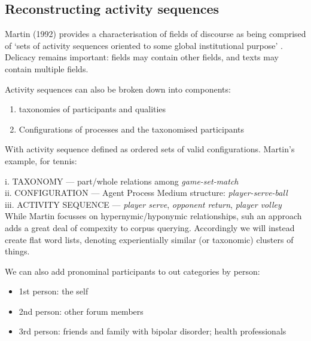 
\subsection{Reconstructing activity sequences}

    Martin (1992) provides a characterisation of fields of discourse as being comprised of `sets of activity sequences oriented to some global institutional purpose' \cite[p.~292]{martin_english_1992}. Delicacy remains important: fields may contain other fields, and texts may contain multiple fields.

    Activity sequences can also be broken down into components:

    \begin{enumerate}
    \item taxonomies of participants and qualities
    \item Configurations of processes and the taxonomised participants
    \end{enumerate}
    With activity sequence defined as ordered sets of valid configurations. Martin's example, for tennis:

    i. TAXONOMY --- part/whole relations among \emph{game-set-match} \\
    ii. CONFIGURATION --- Agent Process Medium structure: \emph{player-serve-ball} \\
    iii. ACTIVITY SEQUENCE --- \emph{player serve}, \emph{opponent return}, \emph{player volley} \\

    While Martin focusses on hypernymic\slash hyponymic relationships, suh an approach adds a great deal of compexity to corpus querying. Accordingly we will instead create flat word lists, denoting experientially similar (or taxonomic) clusters of things.~

    We can also add pronominal participants to out categories by person:

\begin{itemize}
    \item 1st person: the self
    \item 2nd person: other forum members
    \item 3rd person: friends and family with bipolar disorder; health professionals
\end{itemize}
    

